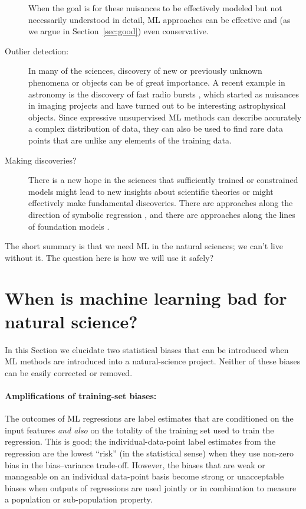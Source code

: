 \documentclass[11pt]{article}
\newcommand{\sectionname}{Section}
\begin{document}
\begin{description}
  When the goal is for these nuisances to be effectively modeled but not necessarily understood in detail, ML approaches can be effective and (as we argue in \sectionname~\ref{sec:good}) even conservative.
  \item[Outlier detection:] In many of the sciences, discovery of new or previously unknown phenomena or objects can be of great importance.
  A recent example in astronomy is the discovery of fast radio bursts \cite{grbs}, which started as nuisances in imaging projects and have turned out to be interesting astrophysical objects.
  Since expressive unsupervised ML methods can describe accurately a complex distribution of data, they can also be used to find rare data points that are unlike any elements of the training data.
  \item[Making discoveries?] There is a new hope in the sciences that sufficiently trained or constrained models might lead to new insights about scientific theories or might effectively make fundamental discoveries.
  There are approaches along the direction of symbolic regression \cite{symbolic1, symbolic2}, and there are approaches along the lines of foundation models \cite{foundation1, foundation2}.
\end{description}
The short summary is that we need ML in the natural sciences; we can't live without it.
The question here is how we will use it safely?

\section{When is machine learning bad for natural science?}\label{sec:bad}
In this \sectionname{} we elucidate two statistical biases that can be introduced when ML methods are introduced into a natural-science project.
Neither of these biases can be easily corrected or removed.

\paragraph{Amplifications of training-set biases:}
The outcomes of ML regressions are label estimates that are conditioned on the input features \emph{and also} on the totality of the training set used to train the regression.
This is good; the individual-data-point label estimates from the regression are the lowest ``risk'' (in the statistical sense) when they use non-zero bias in the bias--variance trade-off.
However, the biases that are weak or manageable on an individual data-point basis become strong or unacceptable biases when outputs of regressions are used jointly or in combination to measure a population or sub-population property.
\end{document}
